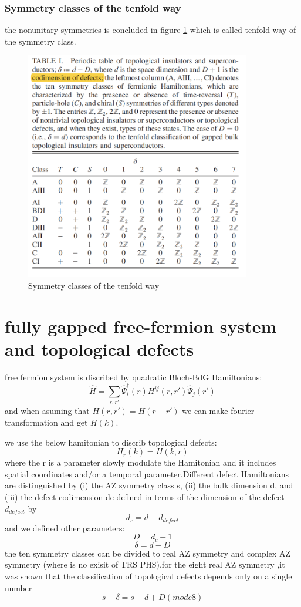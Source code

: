 \subsubsection{Symmetry classes of the tenfold way}
the nonunitary symmetries is concluded in figure \ref{fig:tenfold} which is called tenfold way of the symmetry class.
\begin{figure}
\begin{center}
\includegraphics[height=10cm]{figures/tenfold.png}
\caption{Symmetry classes of the tenfold way}\label{fig:tenfold}
\end{center}
\end{figure}

\section{fully gapped free-fermion system and topological defects}
free fermion system is discribed by quadratic Bloch-BdG Hamiltonians:
\[\hat{H}=\sum_{r,r'}\hat{\Psi}_i^\dagger(r)H^{ij}(r,r')\hat{\Psi}_j(r')\]
and when asuming that $H(r,r')=H(r-r')$  we can make  fourier transformation and get $H(k)$.\par
we use the below hamitonian to discrib topological defects:
\[H_r(k)=H(k,r)\]
where the r is a parameter slowly modulate the Hamitonian and it includes spatial coordinates and/or a temporal parameter.Different defect Hamiltonians are distinguished by (i) the
AZ symmetry class s, (ii) the bulk dimension d, and (iii) the
defect codimension dc defined in terms of the dimension of
the defect $d_{defect}$ by
 \[d_c=d-d_{defect}\]
and we defined other parameters:
\[D=d_c-1\]
\[\delta=d-D\]
the ten symmetry classes can be divided to real AZ symmetry and complex AZ symmetry (where is no exisit of TRS PHS).for the eight real AZ symmetry ,it was shown that the classification of topological defects depends only on a single number
\[s-\delta=s-d+D ( mode 8)\]

